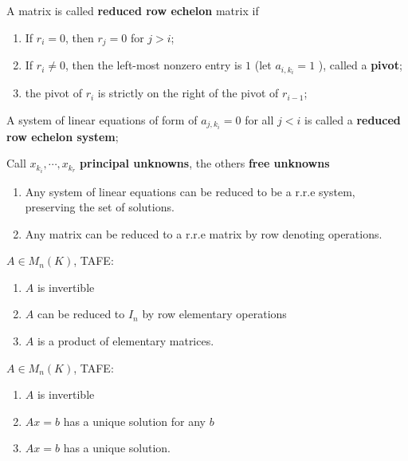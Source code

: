 \begin{definition}
    A matrix is called \textbf{reduced row echelon} matrix if 
    \begin{enumerate}
        \item If  $ r_i=0 $, then  $ r_j=0 $ for  $ j>i $;
        \item If  $ r_i\not=0 $, then the left-most nonzero entry is  $ 1  $ (let  $ a_{i,k_i}=1 $ ), called a \textbf{pivot};  
        \item the pivot of  $ r_i  $ is strictly on the right of the pivot of  $ r_{i-1} $; 
    \end{enumerate}
\end{definition}
\begin{definition}
    A system of linear equations of form of  $ a_{j,k_i}=0 $ for all  $ j<i $ is called a \textbf{reduced row echelon system};
    
    Call  $ x_{k_i},\cdots,x_{k_r} $ \textbf{principal unknowns}, the others \textbf{free unknowns} 
\end{definition}
\begin{proposition}
    \begin{enumerate}
        \item Any system of linear equations can be reduced to be a r.r.e system, preserving the set of solutions.
        \item Any matrix can be reduced to a r.r.e matrix by row denoting operations.
    \end{enumerate}
\end{proposition}
\begin{proposition}
     $ A\in M_n(K ) $, TAFE:
     \begin{enumerate}
        \item  $ A  $ is invertible
        \item  $ A  $ can be reduced to  $ I_n  $ by row elementary operations 
        \item  $ A  $ is a product of elementary matrices.
     \end{enumerate}
\end{proposition}
\begin{proposition}
    $ A\in M_n(K ) $, TAFE:
    \begin{enumerate}
        \item  $ A  $ is invertible
        \item  $ Ax=b  $ has a unique solution for any  $ b  $ 
        \item  $ Ax=b $ has a unique solution. 
    \end{enumerate}
\end{proposition}
